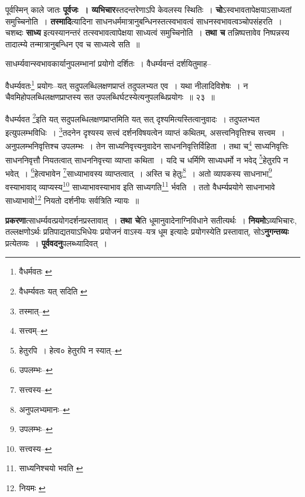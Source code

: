 \documentclass[article,12pt,a4paper]{memoir}
\begin{document}
	  \pstart पूर्वस्मिन् काले जातः \textbf{पूर्वजः । व्यभिचार}स्तदन्तरेणाऽपि केवलस्य स्थितिः । \textbf{चो}ऽस्वभावतापेक्षयाऽसाध्यतां समुच्चिनोति । \textbf{तस्मादि}त्यादिना साधनधर्ममात्रानुबन्धिनस्तत्स्वभावत्वं साधनस्वभावत्वञ्चोपसंहरति । चशब्दः \textbf{साध्य} इत्यस्यानन्तरं तत्स्वभावत्वापेक्षया साध्यत्वं समुच्चिनोति । \textbf{तथा च} तन्निष्पत्तावेव निष्पन्नस्य तादात्म्ये तन्मात्रानुबन्धिन एव च साध्यत्वे सति ॥
	\pend
      \leavevmode{}
	  \bigskip
	  \begingroup
	

	  \pstart साधर्म्यवान्स्वभावकार्यानुपलम्भानां प्रयोगो दर्शितः । वैधर्म्यवन्तं दर्शयितुमाह--
	\pend
       
	  \bigskip
	  \begingroup
	

	  \pstart वैधर्म्यवतः\footnote{वैधर्मवतः \cite{dp-edE}} प्रयोगः--यत् सदुपलब्धिलक्षणप्राप्तं तदुपलभ्यत एव । यथा नीलादिविशेषः । न चैवमिहोपलब्धिलक्षणप्राप्तस्य सत उपलब्धिर्घटस्येत्यनुपलब्धिप्रयोगः ॥ २३ ॥
	\pend
      
	  \endgroup
	 

	  \pstart वैधर्म्यवत \footnote{वैधर्म्यवतः यत् सदिति \cite{dp-msC}}इति यत् सदुपलब्धिलक्षणप्राप्तमिति यत् सत् दृश्यमित्यस्तित्वानुवादः । तदुपलभ्यत इत्युपलम्भविधिः । \footnote{तस्मात्--\cite{dp-msD-n}}तदनेन दृश्यस्य सत्त्वं दर्शनविषयत्वेन व्याप्तं कथितम्, असत्त्वनिवृत्तिश्च सत्त्वम । अनुपलम्भनिवृत्तिश्च उपलम्भः । तेन साध्यनिवृत्त्यनुवादेन साधननिवृत्तिर्विहिता । तथा च\footnote{सत्त्वम्--\cite{dp-msD-n}} साध्यनिवृत्तिः साधननिवृत्तौ नियतत्वात् साधननिवृत्त्या व्याप्ता कथिता । यदि च धर्मिणि साध्यधर्मो न भवेद् \footnote{हेतुरपि । हेत्व० \cite{dp-msB} \cite{dp-edP} \cite{dp-edH} हेतुरपि न स्यात्--\cite{dp-msD}}हेतुरपि न भवेत् । \footnote{उपलम्भः--\cite{dp-msD-n}}हेत्वभावेन \footnote{सत्त्वस्य--\cite{dp-msD-n}}साध्याभावस्य व्याप्तत्वात् । अस्ति च हेतुः\footnote{अनुपलभ्यमानः--\cite{dp-msD-n}} । अतो व्यापकस्य साधनाभा\footnote{उपलम्भः--\cite{dp-msD-n}} वस्याभावाद् व्याप्यस्य\footnote{सत्त्वस्य--\cite{dp-msD-n}} साध्याभावस्याभाव इति साध्यगति\footnote{साध्यनिश्चयो भवति \cite{dp-msA} \cite{dp-msB} \cite{dp-msC} \cite{dp-msD} \cite{dp-edP} \cite{dp-edH} \cite{dp-edE} \cite{dp-edN}} र्भवति । ततो वैधर्म्यप्रयोगे साधनाभावे साध्याभावो\footnote{नियमः \cite{dp-msB}} नियतो दर्शनीयः सर्वत्रिति न्यायः ॥
	\pend
      
	  \endgroup
	

	  \pstart \textbf{प्रकरणा}त्साधर्म्यवत्प्रयोगदर्शनप्रस्तावात् । \textbf{तथा चे}ति धूमानुवादेनाग्निविधाने सतीत्यर्थः । \textbf{नियमो}ऽव्यभिचारः, तल्लक्षणोऽर्थः प्रतिपाद्यतयाऽभिधेयः प्रयोजनं वाऽस्य--यत्र धूम इत्यादेः प्रयोगस्येति प्रस्तावात्, सोऽ\textbf{नुगन्तव्यः} प्रत्येतव्यः । \textbf{पूर्ववदनु}पलब्ध्यादिवत् ।
	\pend
      
\end{document}
